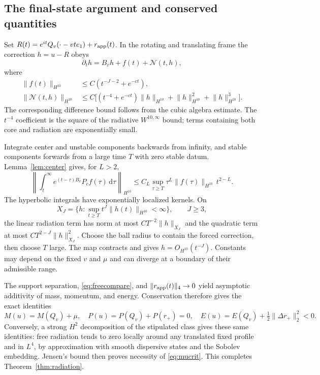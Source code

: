 \documentclass[11pt]{article}
\theoremstyle{definition}
\theoremstyle{remark}
\newcommand{\norm}[1]{\lVert #1\rVert}
\newcommand{\dd}{\,\mathrm d}
\begin{document}
\subsection{The final-state argument and conserved quantities}

Set $R(t)=e^{it}Q_v(\cdot-vte_1)+r_{\rm app}(t)$. In the rotating and translating frame the correction $h=u-R$ obeys
\[
 \partial_t h=B_vh+f(t)+\mathcal N(t,h),
\]
where
\begin{align*}
 \norm{f(t)}_{H^{10}}&\le C(t^{-J-2}+e^{-ct}),\\
 \norm{\mathcal N(t,h)}_{H^{10}}
 &\le C\bigl[(t^{-4}+e^{-ct})\norm h_{H^{10}}
                       +\norm h_{H^{10}}^2+\norm h_{H^{10}}^3\bigr].
\end{align*}
The corresponding difference bound follows from the cubic algebra estimate. The $t^{-4}$ coefficient is the square of the radiative $W^{10,\infty}$ bound; terms containing both core and radiation are exponentially small.

Integrate center and unstable components backwards from infinity, and stable components forwards from a large time $T$ with zero stable datum. Lemma~\ref{lem:center} gives, for $L>2$,
\[
 \left\|\int_t^\infty e^{(t-\tau)B_v}P_cf(\tau)\dd\tau\right\|_{H^{10}}
 \le C_L\sup_{\tau\ge T}\tau^L\norm{f(\tau)}_{H^{10}}\,t^{2-L}.
\]
The hyperbolic integrals have exponentially localized kernels. On
\[
 X_J=\{h:\sup_{t\ge T}t^J\norm{h(t)}_{H^{10}}<\infty\},\qquad J\ge3,
\]
the linear radiation term has norm at most $CT^{-2}\norm h_{X_J}$ and the quadratic term at most $CT^{2-J}\norm h_{X_J}^2$. Choose the ball radius to contain the forced correction, then choose $T$ large. The map contracts and gives $h=O_{H^{10}}(t^{-J})$. Constants may depend on the fixed $v$ and $\mu$ and can diverge at a boundary of their admissible range.

The support separation, \eqref{eq:freecompare}, and $\norm{r_{\rm app}(t)}_4\to0$ yield asymptotic additivity of mass, momentum, and energy. Conservation therefore gives the exact identities
\[
 M(u)=M(Q_v)+\mu,\quad P(u)=P(Q_v)+P(r_+)=0,
 \quad E(u)=E(Q_v)+\tfrac12\norm{\Delta r_+}_2^2<0.
\]
Conversely, a strong $H^2$ decomposition of the stipulated class gives these same identities: free radiation tends to zero locally around any translated fixed profile and in $L^4$, by approximation with smooth dispersive states and the Sobolev embedding. Jensen's bound then proves necessity of \eqref{eq:mucrit}. This completes Theorem~\ref{thm:radiation}.
\end{document}
